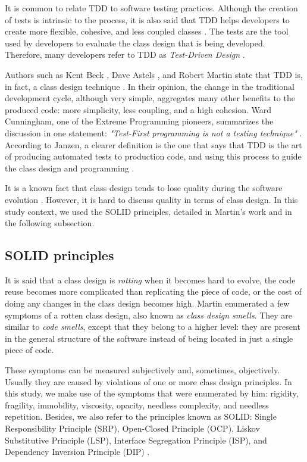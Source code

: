 \documentclass[times]{elsarticle}
\begin{document}
It is common to relate TDD to software testing practices. Although the creation
of tests is intrinsic to the process, it is also said that TDD helps developers
to create more flexible, cohesive, and less coupled classes \cite{tdd-taxonomy}. 
The tests are the tool used by developers to evaluate the class design that is being developed.
Therefore, many developers refer to TDD 
as \textit{Test-Driven Design} \cite{tdd-taxonomy}.

Authors such as Kent Beck \cite{aim-fire}, Dave Astels \cite{astels-tdd}, and
Robert Martin \cite{bob-martin} state that TDD is, in fact, a class design
technique \cite{tdd-taxonomy} \cite{aim-fire}.
In their opinion, the change in the traditional development cycle, although very simple,
aggregates many other benefits to the produced code: more simplicity, less coupling, and
a high cohesion. Ward Cunningham, one of the Extreme Programming pioneers, summarizes
the discussion in one statement: \textit{"Test-First programming is not a testing technique"} 
\cite{aim-fire}.
According to Janzen, a clearer definition is the one that says that TDD is the 
art of producing automated tests to production code, and using this process to guide
the class design and programming \cite{agilealliance-tdd} \cite{tdd-taxonomy}.

It is a known fact that class design tends to lose quality during the software evolution \cite{evolution-lehman}.
However, it is hard to discuss quality in terms of class design. In this study context,
we used the SOLID principles, detailed in Martin's work \cite{bob-martin} and in the following
subsection.

\subsection{SOLID principles}

It is said that a class design is \textit{rotting} when it becomes hard
to evolve, the code reuse becomes more complicated than replicating the piece
of code, or the cost of doing any changes in the class design becomes high.
Martin \cite{bob-martin} enumerated a few symptoms of a rotten class design,
also known as \textit{class design smells}. They are similar to \textit{code smells},
except that they belong to a higher level: they are present in the general structure
of the software instead of being located in just a single piece of code.

These symptoms can be measured subjectively and, sometimes, objectively. Usually
they are caused by violations of one or more class design principles.
In this study, we make use of the symptoms that were enumerated by him: 
rigidity, fragility, immobility, viscosity, opacity, needless complexity, and
needless repetition. Besides, we also refer to the principles known as SOLID:
Single Responsibility Principle (SRP), Open-Closed Principle (OCP),
Liskov Substitutive Principle (LSP), Interface Segregation Principle (ISP), and
Dependency Inversion Principle (DIP) \cite{bob-martin}.
\end{document}
